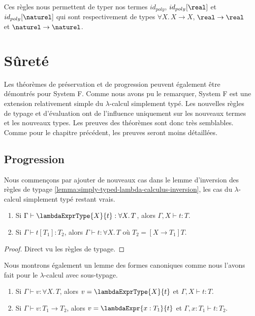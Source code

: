 Ces règles nous permettent de typer nos termes $id_{poly}$, $id_{poly}[\real]$ et
$id_{poly}[\naturel]$ qui sont respectivement de types $\forall X . \, X
\rightarrow X$, $\real \rightarrow \real$ et $\naturel \rightarrow \naturel$.

\section{Sûreté}

Les théorèmes de préservation et de progression peuvent également être démontrés
pour System F. Comme nous avons pu le remarquer, System F est une extension
relativement simple du $\lambda$-calcul simplement typé. Les nouvelles règles de typage
et d'évaluation ont de l'influence uniquement sur les nouveaux termes et les
nouveaux types. Les preuves des théorèmes sont donc très semblables. Comme pour
le chapitre précédent, les preuves seront moins détaillées.

\subsection*{Progression}

Nous commençons par ajouter de nouveaux cas dans le lemme d'inversion des règles
de typage \ref{lemma:simply-typed-lambda-calculus-inversion}, les cas du
$\lambda$-calcul simplement typé restant vrais.

\begin{lemma} 
  \begin{enumerate}
    \item Si $\Gamma \vdash \lambdaExprType{X}{t} : \forall X . \, T$, alors
      $\Gamma, X \vdash t : T$.
    \item Si $\Gamma \vdash t[T_{1}] : T_{2}$, alors $\Gamma \vdash t : \forall X .
      \, T$ où $T_{2} = [X \rightarrow T_{1}] T$.
  \end{enumerate}
\end{lemma}
  
\begin{proof}
  Direct vu les règles de typage.
\end{proof}

Nous montrons également un lemme des formes canoniques comme nous l'avons fait
pour le $\lambda$-calcul avec sous-typage.

\begin{lemma} 
  \begin{enumerate}
  \item Si $\Gamma \vdash v : \forall X . \, T$, alors $v =
    \lambdaExprType{X}{t}$ et $\Gamma, X \vdash t : T$.
  \item Si $\Gamma \vdash v : T_{1} \rightarrow T_{2}$, alors $v =
    \lambdaExpr{x : T_{1}}{t}$ et $\Gamma, x : T_{1} \vdash t : T_{2}$.
  \end{enumerate}
\end{lemma}

